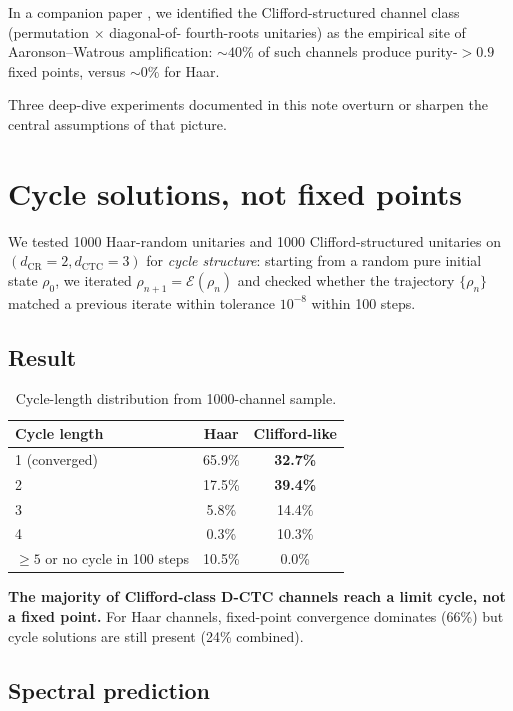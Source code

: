 \documentclass[11pt,a4paper]{article}
\begin{document}
In a companion paper \cite{Knopp2026DCTC}, we identified the
Clifford-structured channel class (permutation $\times$ diagonal-of-
fourth-roots unitaries) as the empirical site of Aaronson--Watrous
amplification: $\sim 40\%$ of such channels produce purity-$> 0.9$
fixed points, versus $\sim 0\%$ for Haar.

Three deep-dive experiments documented in this note overturn or
sharpen the central assumptions of that picture.

\section{Cycle solutions, not fixed points}

We tested 1000 Haar-random unitaries and 1000 Clifford-structured
unitaries on $(d_{\text{CR}}=2, d_{\text{CTC}}=3)$ for
\emph{cycle structure}: starting from a random pure initial state
$\rho_0$, we iterated $\rho_{n+1} = \mathcal{E}(\rho_n)$ and checked
whether the trajectory $\{\rho_n\}$ matched a previous iterate within
tolerance $10^{-8}$ within 100 steps.

\subsection*{Result}

\begin{table}[h]
\centering
\caption{Cycle-length distribution from 1000-channel sample.}
\label{tab:cycle-dist}
\begin{tabular}{lcc}
\toprule
Cycle length & Haar & Clifford-like \\
\midrule
1 (converged) & 65.9\% & \textbf{32.7\%} \\
2 & 17.5\% & \textbf{39.4\%} \\
3 & 5.8\% & 14.4\% \\
4 & 0.3\% & 10.3\% \\
$\ge 5$ or no cycle in 100 steps & 10.5\% & 0.0\% \\
\bottomrule
\end{tabular}
\end{table}

\textbf{The majority of Clifford-class D-CTC channels reach a limit
cycle, not a fixed point.} For Haar channels, fixed-point convergence
dominates (66\%) but cycle solutions are still present (24\%
combined).

\subsection*{Spectral prediction}
\end{document}
